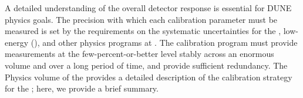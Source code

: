 


\label{sec:sp-calib-ov-intro}


A detailed understanding of the overall detector response is essential for DUNE physics goals. The precision with which each calibration parameter must be measured is set by the requirements on the %
systematic uncertainties for the , low-energy (), and other physics programs at . The calibration 
program 
must provide measurements at the few-percent-or-better 
level stably across an enormous volume and over a long period of time, and provide sufficient redundancy. The Physics volume of the  provides a detailed description of the calibration strategy for the  ; here, we provide a brief summary.

